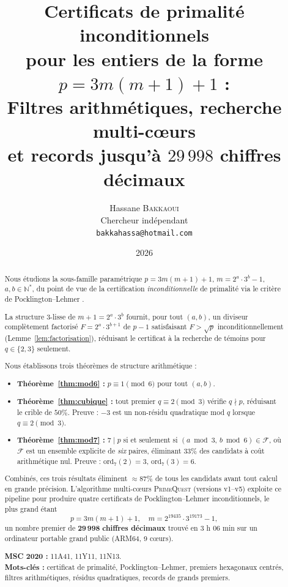 \documentclass[11pt,a4paper]{article}
\title{Certificats de primalité inconditionnels\\
pour les entiers de la forme $p = 3m(m+1)+1$ :\\[4pt]
{\large Filtres arithmétiques, recherche multi-cœurs\\
et records jusqu'à $29\,998$ chiffres décimaux}}
\author{Hassane \textsc{Bakkaoui}\\
\small Chercheur indépendant\\
\small \texttt{bakkahassa@hotmail.com}}
\date{2026}
\theoremstyle{definition}
\theoremstyle{remark}
\newcommand{\N}{\mathbb{N}}
\newcommand{\F}{\mathcal{F}}
\begin{document}
\maketitle

\begin{abstract}
Nous étudions la sous-famille paramétrique $p = 3m(m+1)+1$,
$m = 2^a\cdot 3^b - 1$, $a,b \in \N^*$, du point de vue de la
certification \emph{inconditionnelle} de primalité via le critère de
Pocklington--Lehmer \cite{Pocklington1914,LehmerPSW1975}.

La structure $3$-lisse de $m+1 = 2^a\cdot 3^b$ fournit, pour tout $(a,b)$,
un diviseur complètement factorisé $F = 2^a\cdot 3^{b+1}$ de $p-1$
satisfaisant $F>\sqrt{p}$ inconditionnellement
(Lemme~\ref{lem:factorisation}), réduisant le certificat à la recherche
de témoins pour $q\in\{2,3\}$ seulement.

Nous établissons trois théorèmes de structure arithmétique :
\begin{itemize}
\item \textbf{Théorème~\ref{thm:mod6} :}
  $p\equiv 1\pmod{6}$ pour tout $(a,b)$.
\item \textbf{Théorème~\ref{thm:cubique} :}
  tout premier $q\equiv 2\pmod{3}$ vérifie $q\nmid p$,
  réduisant le crible de $50\%$.
  Preuve : $-3$ est un non-résidu quadratique mod $q$ lorsque
  $q\equiv 2\pmod{3}$.
\item \textbf{Théorème~\ref{thm:mod7} :}
  $7\mid p$ si et seulement si $(a\bmod 3,\,b\bmod 6)\in\F$,
  où $\F$ est un ensemble explicite de \emph{six} paires,
  éliminant $33\%$ des candidats à coût arithmétique nul.
  Preuve : $\mathrm{ord}_7(2)=3$, $\mathrm{ord}_7(3)=6$.
\end{itemize}

Combinés, ces trois résultats éliminent $\approx 87\%$ de tous les
candidats avant tout calcul en grande précision. L'algorithme
multi-cœurs \textsc{PrimeQuest} (versions v1--v5) exploite ce pipeline
pour produire quatre certificats de Pocklington--Lehmer inconditionnels,
le plus grand étant
\[
  p = 3m(m+1)+1,\quad m = 2^{19435}\cdot 3^{19173}-1,
\]
un nombre premier de $\mathbf{29\,998}$ \textbf{chiffres décimaux} trouvé
en $3$ h $06$ min sur un ordinateur portable grand public
(ARM64, 9 cœurs).

\smallskip
\noindent\textbf{MSC 2020 :} 11A41, 11Y11, 11N13.\\
\textbf{Mots-clés :} certificat de primalité, Pocklington--Lehmer,
premiers hexagonaux centrés, filtres arithmétiques, résidus quadratiques,
records de grands premiers.
\end{abstract}
\end{document}
